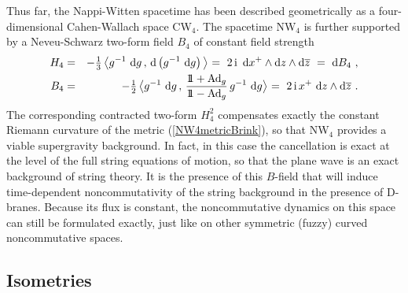 \documentclass[11pt,a4paper]{article}
\newcommand{\ii}{{\rm i}}
\def\ii{{\,{\rm i}\,}}
\def\dd{{\rm d}}
\newcommand{\id}{{1\!\!1}} %
\def\nn{\nonumber}
\def\bea{\begin{eqnarray}}
\def\eea{\end{eqnarray}}
\begin{document}
Thus far, the Nappi-Witten spacetime has been described geometrically
as a four-dimensional Cahen-Wallach space CW$_4$. The spacetime NW$_4$
is further supported by a Neveu-Schwarz two-form field $B_4$ of constant
field strength
\bea
H_4&=&-\mbox{$\frac13$}\,\bigl\langle g^{-1}~\dd g\,,\,\dd
\left(g^{-1}~\dd g\right)\bigl\rangle
~=~2\ii~\dd x^+\wedge\dd z\wedge\dd\overline{z}~=~\dd B_4 \ , \nn\\
B_4&=&-\mbox{$\frac12$}\,\bigl\langle g^{-1}~\dd g\,,\,
\frac{\id+{\rm Ad}_g}{\id-{\rm Ad}_g}\,g^{-1}~\dd g\bigl\rangle~=~
2\ii x^+~\dd z\wedge\dd\overline{z} \ .
\label{NS2formBrink}\eea
The corresponding contracted two-form $H_4^2$ compensates exactly the
constant Riemann curvature of the metric (\ref{NW4metricBrink}), so
that NW$_4$ provides a viable supergravity background. In fact, in
this case the cancellation is exact at the level of the full string
equations of motion, so that the plane wave is an exact background of
string theory. It is the presence of
this $B$-field that will induce time-dependent noncommutativity of the
string background in the presence of D-branes. Because its flux is
constant, the noncommutative dynamics on this space can still be
formulated exactly, just like on other symmetric (fuzzy) curved
noncommutative spaces.

\subsection{Isometries \label{Isoms}}
\end{document}
